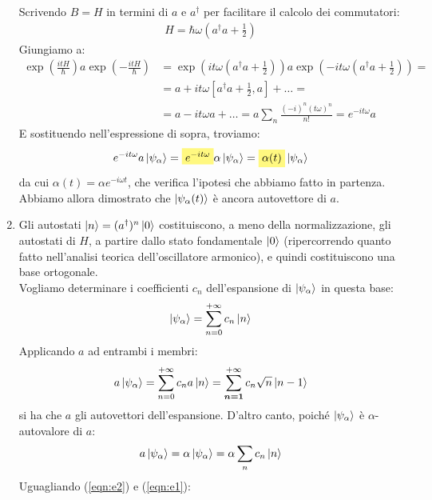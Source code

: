 \documentclass[../../FisicaTeorica.tex]{subfiles}
\begin{document}
\begin{enumerate}
Scrivendo $B=H$ in termini di $a$ e $a^\dag$ per facilitare il calcolo dei commutatori:
\begin{align*}
H= \hbar \omega \left(a^\dag a +\frac{1}{2}\right)
\end{align*}
Giungiamo a:
\begin{align*}
\exp\left(\frac{itH}{\hbar}\right) a \exp\left(-\frac{itH}{\hbar}\right) &= \exp \left(it\omega \left(a^\dag a +\frac{1}{2}\right) \right) a \exp\left(-it\omega \left(a^\dag a + \frac{1}{2}\right)\right) =\\
&= a + it\omega \left[a^\dag a + \frac{1}{2},a \right] +\dots =\\
&=a - it\omega a+ \dots = a \sum_{n} \frac{(-i)^n (t\omega)^n}{n!} =e^{-it\omega} a
\end{align*}
E sostituendo nell'espressione di sopra, troviamo:
\begin{align*}
e^{-it\omega} a \ket{\psi_\alpha} = \hlc{Yellow}{e^{-it\omega}} \alpha \ket{\psi_\alpha}=\hlc{Yellow}{ \alpha(t)}\ket{\psi_\alpha}
\end{align*}
da cui $\alpha(t) = \alpha e^{-i\omega t}$, che verifica l'ipotesi che abbiamo fatto in partenza. Abbiamo allora dimostrato che $\Ket{\psi_\alpha(t)}$ è ancora autovettore di $a$.
\item Gli autostati $\Ket{n} = (a^\dag)^n \Ket{0}$ costituiscono, a meno della normalizzazione, gli autostati di $H$,  a partire dallo stato fondamentale $\Ket{0}$ (ripercorrendo quanto fatto nell'analisi teorica dell'oscillatore armonico), e quindi costituiscono una base ortogonale.\\
Vogliamo determinare i coefficienti $c_n$ dell'espansione di $\Ket{\psi_\alpha}$ in questa base:
\begin{align*}
\Ket{\psi_\alpha} = \sum_{n=0}^{+\infty} c_n \Ket{n}
\end{align*}
Applicando $a$ ad entrambi i membri:
\begin{align}
a \Ket{\psi_\alpha} = \sum_{n=0}^{+\infty} c_n a \Ket{n} = \sum_{\bm{n=1}}^{+\infty} c_n \sqrt{n}\Ket{n-1}
\label{eqn:e2}
\end{align}
si ha che $a$  gli autovettori dell'espansione. D'altro canto, poiché $\Ket{\psi_\alpha}$ è $\alpha$-autovalore di $a$:
\begin{align}
a \Ket{\psi_\alpha} = \alpha \Ket{\psi_\alpha} = \alpha \sum_n c_n \Ket{n}
\label{eqn:e1}
\end{align}
Uguagliando (\ref{eqn:e2}) e (\ref{eqn:e1}):
\begin{align*}

\end{align*}
\end{enumerate}
\end{document}

